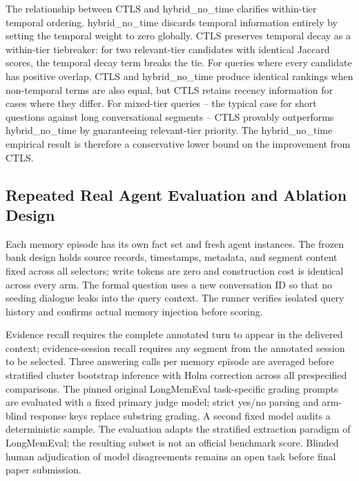 The relationship between CTLS and hybrid\_no\_time clarifies within-tier temporal ordering. hybrid\_no\_time discards temporal information entirely by setting the temporal weight to zero globally. CTLS preserves temporal decay as a within-tier tiebreaker: for two relevant-tier candidates with identical Jaccard scores, the temporal decay term breaks the tie. For queries where every candidate has positive overlap, CTLS and hybrid\_no\_time produce identical rankings when non-temporal terms are also equal, but CTLS retains recency information for cases where they differ. For mixed-tier queries -- the typical case for short questions against long conversational segments -- CTLS provably outperforms hybrid\_no\_time by guaranteeing relevant-tier priority. The hybrid\_no\_time empirical result is therefore a conservative lower bound on the improvement from CTLS.

\subsection{Repeated Real Agent Evaluation and Ablation Design}

\label{sec:method_protocol}

Each memory episode has its own fact set and fresh agent instances. The frozen bank design holds source records, timestamps, metadata, and segment content fixed across all selectors; write tokens are zero and construction cost is identical across every arm. The formal question uses a new conversation ID so that no seeding dialogue leaks into the query context. The runner verifies isolated query history and confirms actual memory injection before scoring. \citep{ref_ab2c226739f2f52a}

Evidence recall requires the complete annotated turn to appear in the delivered context; evidence-session recall requires any segment from the annotated session to be selected. Three answering calls per memory episode are averaged before stratified cluster bootstrap inference with Holm correction across all prespecified comparisons. The pinned original LongMemEval task-specific grading prompts are evaluated with a fixed primary judge model; strict yes/no parsing and arm-blind response keys replace substring grading. A second fixed model audits a deterministic sample. The evaluation adapts the stratified extraction paradigm of LongMemEval; the resulting subset is not an official benchmark score. Blinded human adjudication of model disagreements remains an open task before final paper submission.

